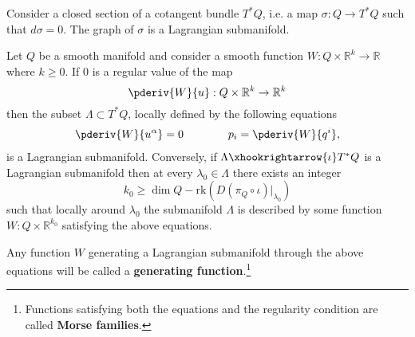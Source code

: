 
    \begin{example}\label{diff:closed_section_submanifold}
        Consider a closed section of a cotangent bundle $T^*Q$, i.e. a map $\sigma:Q\rightarrow T^*Q$ such that $d\sigma=0$. The graph of $\sigma$ is a Lagrangian submanifold.
    \end{example}

    \begin{theorem}
        Let $Q$ be a smooth manifold and consider a smooth function $W:Q\times\mathbb{R}^k\rightarrow\mathbb{R}$ where $k\geq 0$. If 0 is a regular value of the map \[\pderiv{W}{u}:Q\times\mathbb{R}^k\rightarrow\mathbb{R}^k\] then the subset $\Lambda\subset T^*Q$, locally defined by the following equations
        \begin{gather}
            \pderiv{W}{u^\alpha} = 0\qquad\qquad p_i=\pderiv{W}{q^i},
        \end{gather}
        is a Lagrangian submanifold. Conversely, if $\Lambda\xhookrightarrow{\iota}T^*Q$ is a Lagrangian submanifold then at every $\lambda_0\in\Lambda$ there exists an integer \[k_0\geq\dim Q - \text{rk}\left(D(\pi_Q\circ\iota)|_{\lambda_0}\right)\] such that locally around $\lambda_0$ the submanifold $\Lambda$ is described by some function $W:Q\times\mathbb{R}^{k_0}$ satisfying the above equations.
    \end{theorem}
    Any function $W$ generating a Lagrangian submanifold through the above equations will be called a \textbf{generating function}.\footnote{Functions satisfying both the equations and the regularity condition are called \textbf{Morse families}.}

